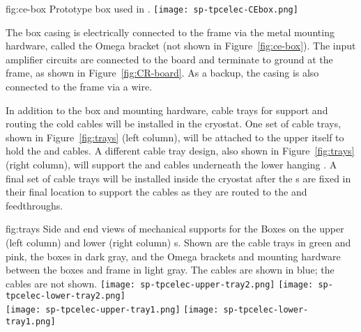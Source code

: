 \begin{dunefigure}
{fig:ce-box}
{Prototype  box used in .}
\texttt{[image: sp-tpcelec-CEbox.png]}
\end{dunefigure}

The  box casing is electrically connected to the 
 frame via the metal mounting hardware, called the 
Omega bracket (not shown in Figure~\ref{fig:ce-box}). The 
input amplifier circuits  are connected to the  board  
and terminate to ground at the  frame, as 
shown in Figure~\ref{fig:CR-board}.  As a backup, the casing is 
also connected to the  frame via a wire.

In addition to the  box and mounting hardware, cable trays 
for support and routing the cold cables will be installed in the 
cryostat. One set of cable trays, shown in Figure~\ref{fig:trays} 
(left column), will be attached to the upper  itself 
to hold the  and  cables. A different cable 
tray design, also shown in Figure~\ref{fig:trays} (right column), 
will support the  and  cables underneath the 
lower hanging . A final set of cable trays will be 
installed inside the cryostat after the s are 
fixed in their final location to support the cables as they are 
routed to the  and  feedthroughs.

\begin{dunefigure}
{fig:trays}
{Side and end views of mechanical supports for the  
Boxes on the upper (left column) and lower (right column) 
s. Shown are the  cable trays in green and pink, 
the  boxes in dark gray, and the Omega brackets and mounting 
hardware between the  boxes and  frame in light gray.  
The  cables are shown in blue; the  cables are not shown.}
\texttt{[image: sp-tpcelec-upper-tray2.png]}
\hspace{5mm}
\texttt{[image: sp-tpcelec-lower-tray2.png]} \\
\texttt{[image: sp-tpcelec-upper-tray1.png]}
\hspace{5mm}
\texttt{[image: sp-tpcelec-lower-tray1.png]}
\end{dunefigure}


